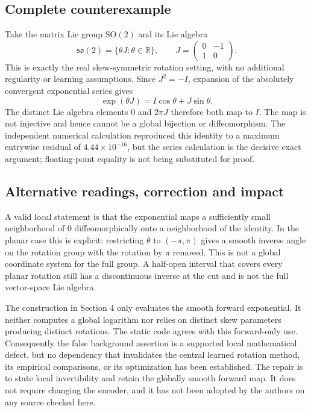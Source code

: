 \documentclass[10pt]{article}
\begin{document}
\subsection*{Complete counterexample}
Take the matrix Lie group \(\mathrm{SO}(2)\) and its Lie algebra \[\mathfrak{so}(2)=\{\theta J:\theta\in\mathbb R\},
 \qquad J=\begin{pmatrix}0&-1\\1&0\end{pmatrix}.\] This is exactly the real skew-symmetric rotation setting, with no additional regularity or learning assumptions. Since \(J^2=-I\), expansion of the absolutely convergent exponential series gives \[\exp(\theta J)=I\cos\theta+J\sin\theta.\] The distinct Lie algebra elements \(0\) and \(2\pi J\) therefore both map to \(I\). The map is not injective and hence cannot be a global bijection or diffeomorphism. The independent numerical calculation reproduced this identity to a maximum entrywise residual of \(4.44\times10^{-16}\), but the series calculation is the decisive exact argument; floating-point equality is not being substituted for proof.\par
\subsection*{Alternative readings, correction and impact}
A valid local statement is that the exponential maps a sufficiently small neighborhood of \(0\) diffeomorphically onto a neighborhood of the identity. In the planar case this is explicit: restricting \(\theta\) to \((-\pi,\pi)\) gives a smooth inverse angle on the rotation group with the rotation by \(\pi\) removed. This is not a global coordinate system for the full group. A half-open interval that covers every planar rotation still has a discontinuous inverse at the cut and is not the full vector-space Lie algebra.\par
The construction in Section 4 only evaluates the smooth forward exponential. It neither computes a global logarithm nor relies on distinct skew parameters producing distinct rotations. The static code agrees with this forward-only use. Consequently the false background assertion is a supported local mathematical defect, but no dependency that invalidates the central learned rotation method, its empirical comparisons, or its optimization has been established. The repair is to state local invertibility and retain the globally smooth forward map. It does not require changing the encoder, and it has not been adopted by the authors on any source checked here.\par
\end{document}
